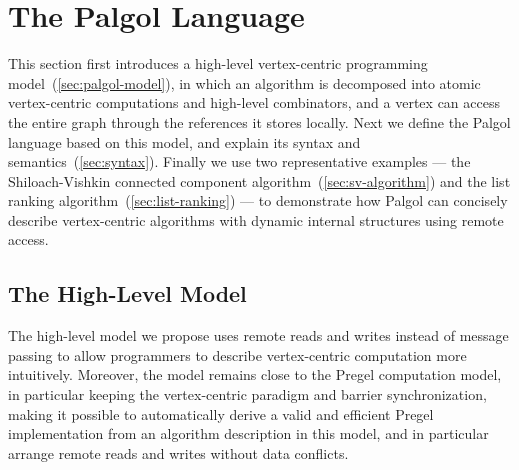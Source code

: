 \documentclass{sokendai_thesis} %
\begin{document}
\chapter{The Palgol Language}

This section first introduces a high-level vertex-centric programming model~(\autoref{sec:palgol-model}), in which an algorithm is decomposed into atomic vertex-centric computations and high-level combinators, and a vertex can access the entire graph through the references it stores locally.
Next we define the Palgol language based on this model, and explain its syntax and semantics~(\autoref{sec:syntax}).
Finally we use two representative examples --- the Shiloach-Vishkin connected component algorithm~(\autoref{sec:sv-algorithm}) and the list ranking algorithm~(\autoref{sec:list-ranking}) --- to demonstrate how Palgol can concisely describe vertex-centric algorithms with dynamic internal structures using remote access.


\section{The High-Level Model}
\label{sec:palgol-model}

The high-level model we propose uses remote reads and writes instead of message passing to allow programmers to describe vertex-centric computation more intuitively. %
Moreover, the model remains close to the Pregel computation model, in particular keeping the vertex-centric paradigm and barrier synchronization, making it possible to automatically derive a valid and efficient Pregel implementation from an algorithm description in this model, and in particular arrange remote reads and writes without data conflicts.
\end{document}
